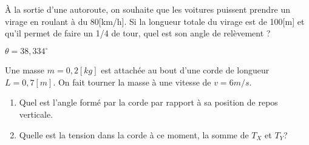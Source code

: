 \begin{exercise}
    À la sortie d'une autoroute, on souhaite que les voitures puissent prendre un virage en roulant à du 80[km/h]. Si la longueur totale du virage est de 100[m] et qu'il permet de faire un 1/4 de tour, quel est son angle de relèvement ?
\end{exercise}
\begin{solution}
    \(\theta=38,334 ^{\circ}\)
\end{solution}

\begin{exercise}
    Une masse \(m=0,2[kg]\) est attachée au bout d’une corde de longueur \(L=0,7[m]\). On fait tourner la masse à une vitesse de \(v=6m/s\).
    \begin{enumerate}[a]
        \item Quel est l’angle formé par la corde par rapport à sa position de repos verticale.
        \item Quelle est la tension dans la corde à ce moment, la somme de \(T_X\) et \(T_Y\)?
    \end{enumerate}
\end{exercise}
\begin{solution}

\end{solution}
